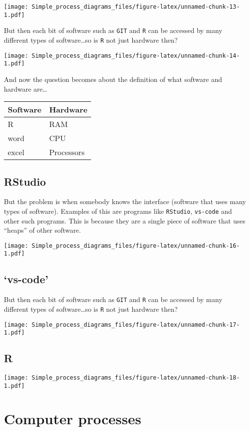 \documentclass[]{book}
\begin{document}
\texttt{[image: Simple\_process\_diagrams\_files/figure-latex/unnamed-chunk-13-1.pdf]}

But then each bit of software such as \texttt{GIT} and \texttt{R} can be accessed by many different types of software\ldots so is \texttt{R} not just hardware then?

\texttt{[image: Simple\_process\_diagrams\_files/figure-latex/unnamed-chunk-14-1.pdf]}

And now the question becomes about the definition of what software and hardware are\ldots{}

\begin{longtable}[]{@{}ll@{}}
\toprule
Software & Hardware\tabularnewline
\midrule
\endhead
R & RAM\tabularnewline
word & CPU\tabularnewline
excel & Processors\tabularnewline
\bottomrule
\end{longtable}

\hypertarget{rstudio}{%
\subsection{RStudio}\label{rstudio}}

But the problem is when somebody knows the interface (software that uses many types of software). Examples of this are programs like \texttt{RStudio}, \texttt{vs-code} and other such programs. This is because they are a single piece of software that uses ``heaps'' of other software.

\texttt{[image: Simple\_process\_diagrams\_files/figure-latex/unnamed-chunk-16-1.pdf]}

\hypertarget{vs-code}{%
\subsection{`vs-code'}\label{vs-code}}

But then each bit of software such as \texttt{GIT} and \texttt{R} can be accessed by many different types of software\ldots so is \texttt{R} not just hardware then?

\texttt{[image: Simple\_process\_diagrams\_files/figure-latex/unnamed-chunk-17-1.pdf]}

\hypertarget{r}{%
\subsection{R}\label{r}}

\texttt{[image: Simple\_process\_diagrams\_files/figure-latex/unnamed-chunk-18-1.pdf]}

\hypertarget{computer-processes}{%
\section{Computer processes}\label{computer-processes}}
\end{document}

